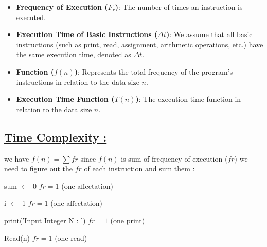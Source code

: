 \vspace{0.35cm}

\begin{tcolorbox}[enhanced, colback=white!90!greenPlot, colframe=greenPlot!60!black, coltitle=white, fonttitle=\bfseries\Large, title=Some Terminology, boxrule=1mm, arc=0.5mm, drop shadow=greenPlot!35!gray]
\begin{itemize}
    \item \textbf{Frequency of Execution (\(F_r\))}: The number of times an instruction is executed.
    \item \textbf{Execution Time of Basic Instructions (\(\Delta t\))}: We assume that all basic instructions
(such as print, read, assignment, arithmetic operations, etc.) have the same execution time, denoted as \(\Delta t\).
    \item \textbf{Function (\(f(n)\))}: Represents the total frequency of the program's instructions in relation to the data size \(n\).
    \item \textbf{Execution Time Function (\(T(n)\))}: The execution time function in relation to the data size \(n\).
\end{itemize}
\end{tcolorbox}


\vspace{0.5cm}
\newpage
\subsection*{\underline{Time Complexity :}}
we have \(f(n) = \sum fr\) since \(f(n)\) is sum of frequency of execution (\(fr\)) we need to figure out the
\(fr\) of each instruction and sum them : 

\vspace{0.5cm}
sum $\gets$ 0  \hspace{4.15cm} \(fr = 1\) (one affectation)

\vspace{0.15cm}
i $\gets$ 1  \hspace{4.65cm} \(fr = 1\) (one affectation)

\vspace{0.15cm}
\textcolor{purplePlot!80!black}{print}(\textcolor{blueArea!60!black}{'Input Integer N : '})  \hspace{1.5cm} \(fr = 1\) (one print)

\vspace{0.15cm}
\textcolor{purplePlot!80!black}{Read}(n)  \hspace{4.25cm} \(fr = 1\) (one read)

